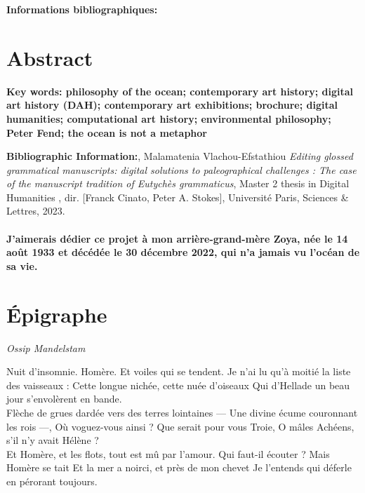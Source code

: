 \documentclass[a4paper, twoside, 12pt]{book}
\begin{document}
\textbf{Informations bibliographiques:}  


\section*{Abstract}


\medskip

\textbf{Key words: philosophy of the ocean; contemporary art history; digital art history (DAH); contemporary art exhibitions; brochure; digital humanities; computational art history; environmental philosophy; Peter Fend; the ocean is not a metaphor}

\textbf{Bibliographic Information:}, Malamatenia Vlachou-Efstathiou \textit{Editing glossed grammatical manuscripts: digital solutions to paleographical challenges : The case of the manuscript tradition of Eutychès grammaticus}, Master 2 thesis in \og Digital Humanities \fg{}, dir. [Franck Cinato, Peter A. Stokes], Université Paris, Sciences \& Lettres, 2023.

\clearpage


\paragraph{J'aimerais dédier ce projet à mon arrière-grand-mère Zoya, née le 14 août 1933 et décédée le 30 décembre 2022, qui n'a jamais vu l'océan de sa vie.}


\section{Épigraphe}

\textit{Ossip Mandelstam}

Nuit d’insomnie. Homère. Et voiles qui se tendent.
Je n’ai lu qu’à moitié la liste des vaisseaux :
Cette longue nichée, cette nuée d’oiseaux
Qui d’Hellade un beau jour s’envolèrent en bande.\\

Flèche de grues dardée vers des terres lointaines
— Une divine écume couronnant les rois —,
Où voguez-vous ainsi ? Que serait pour vous Troie,
O mâles Achéens, s’il n’y avait Hélène ?\\

Et Homère, et les flots, tout est mû par l’amour.
Qui faut-il écouter ? Mais Homère se tait
Et la mer a noirci, et près de mon chevet
Je l’entends qui déferle en pérorant toujours.\\
\end{document}
